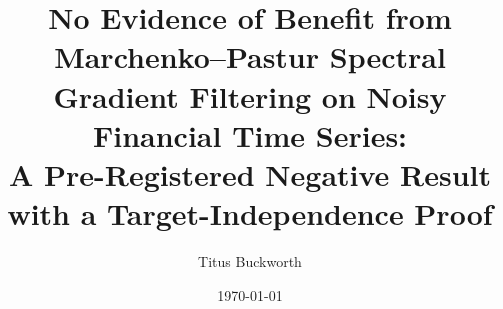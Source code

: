 



\title{No Evidence of Benefit from Marchenko--Pastur Spectral Gradient
  Filtering on Noisy Financial Time Series:\\
  A Pre-Registered Negative Result with a Target-Independence Proof}
\author{Titus Buckworth}
\date{\today}
\maketitle
















